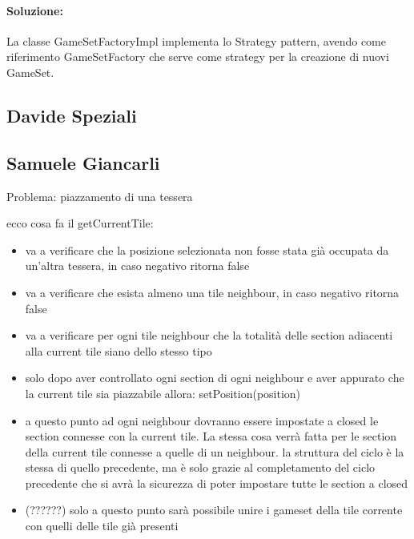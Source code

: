 \paragraph{Soluzione:}
La classe GameSetFactoryImpl implementa lo Strategy pattern, avendo come riferimento GameSetFactory che serve come strategy per la creazione di nuovi GameSet.

\subsection*{Davide Speziali}

\subsection*{Samuele Giancarli}


Problema: piazzamento di una tessera



ecco cosa fa il getCurrentTile:

\begin{itemize}
\item va a verificare che la posizione selezionata non fosse stata già occupata da un’altra tessera, in caso negativo ritorna false
\item va a verificare che esista almeno una tile neighbour, in caso negativo ritorna false
\item va a verificare per ogni tile neighbour che la totalità delle section adiacenti alla current tile siano dello stesso tipo
\item solo dopo aver controllato ogni section di ogni neighbour e aver appurato che la current tile sia piazzabile allora: setPosition(position)
\item a questo punto ad ogni neighbour dovranno essere impostate a closed le section connesse con la current tile. La stessa cosa verrà fatta per le section della current tile connesse a quelle di un neighbour.
\subitem la struttura del ciclo è la stessa di quello precedente, ma è solo grazie al completamento del ciclo precedente che si avrà la sicurezza di poter impostare tutte le section a closed
\item (??????) solo a questo punto sarà possibile unire i gameset della tile corrente con quelli delle tile già presenti
\end{itemize}
